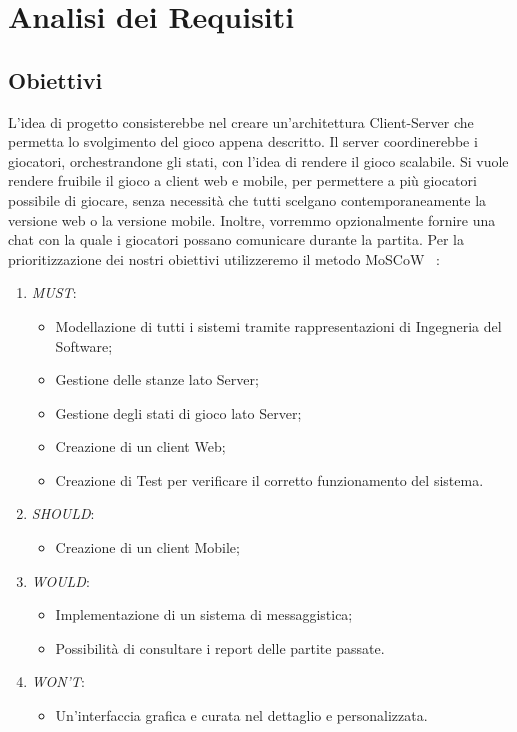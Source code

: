 \section{Analisi dei Requisiti}
\subsection{Obiettivi}
L’idea di progetto consisterebbe nel creare un’architettura Client-Server che permetta lo svolgimento del gioco appena descritto.\newline
\noindent Il server coordinerebbe i giocatori, orchestrandone gli stati, con l’idea di rendere il gioco scalabile. Si vuole rendere fruibile il gioco a client web e mobile, per permettere a più giocatori possibile di giocare, senza necessità che tutti scelgano contemporaneamente la versione web o la versione mobile. Inoltre, vorremmo opzionalmente fornire una chat con la quale i giocatori possano comunicare durante la partita.\newline
Per la prioritizzazione dei nostri obiettivi utilizzeremo il metodo MoSCoW ~\cite{MetodoMo:online}:
\begin{enumerate}
    \item \textit{MUST}:
    \begin{itemize}
        \item Modellazione di tutti i sistemi tramite rappresentazioni di Ingegneria del Software;
        \item Gestione delle stanze lato Server;
        \item Gestione degli stati di gioco lato Server;        \item Creazione di un client Web;
        \item Creazione di Test per verificare il corretto funzionamento del sistema.
    \end{itemize}
    \item \textit{SHOULD}:
    \begin{itemize}
        \item Creazione di un client Mobile;
    \end{itemize}
    \item \textit{WOULD}:
        \begin{itemize}
            \item Implementazione di un sistema di messaggistica;
            \item Possibilità di consultare i report delle partite passate.
        \end{itemize}
    \item \textit{WON'T}:
    \begin{itemize}
        \item Un'interfaccia grafica e curata nel dettaglio e personalizzata.
    \end{itemize}
\end{enumerate}
